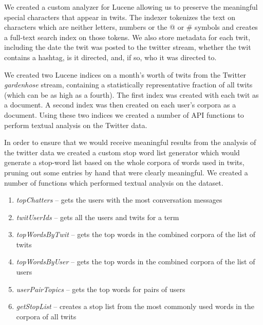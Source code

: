 \documentclass[10pt,oneside]{memoir}
\begin{document}
We created a custom analyzer for Lucene allowing us to preserve the
meaningful special characters that appear in twits. The indexer
tokenizes the text on characters which are neither letters, numbers
or the @ or \# symbols and creates a full-text search index on
those tokens. We also store metadata for each twit, including the
date the twit was posted to the twitter stream, whether the twit
contains a hashtag, is it directed, and, if so, who it was directed
to.


We created two Lucene indices on a month's worth of twits from the
Twitter {\itshape gardenhose} stream, containing a statistically
representative fraction of all twits (which can be as high as a
fourth). The first index was created with each twit as a document.
A second index was then created on each user's corpora as a
document. Using these two indices we created a number of API
functions to perform textual analysis on the Twitter data.


In order to ensure that we would receive meaningful results from
the analysis of the twitter data we created a custom stop word list
generator which would generate a stop-word list based on the whole
corpora of words used in twits, pruning out some entries by hand
that were clearly meaningful. We created a number of functions
which performed textual analysis on the dataset.


\begin{enumerate}


\item {\itshape topChatters} -- gets the users with the most conversation
messages




\item {\itshape twitUserIds} -- gets all the users and twits for a term




\item {\itshape topWordsByTwit} -- gets the top words in the combined corpora
of the list of twits




\item {\itshape topWordsByUser} -- gets the top words in the combined corpora
of the list of users




\item {\itshape userPairTopics} -- gets the top words for pairs of users




\item {\itshape getStopList} -- creates a stop list from the most commonly used
words in the corpora of all twits



\end{enumerate}
\end{document}
